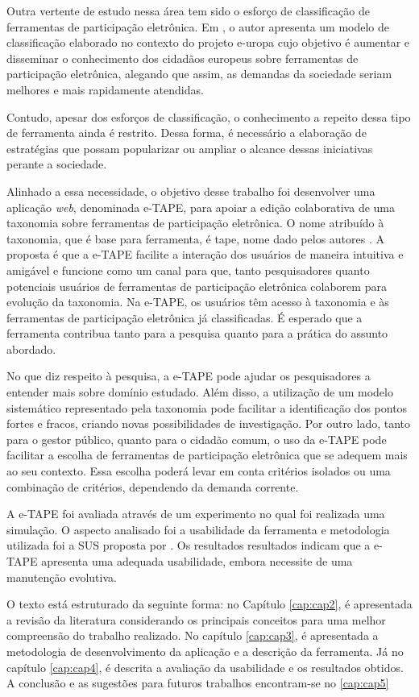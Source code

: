 \par
Outra vertente de estudo nessa área tem sido o esforço de classificação de ferramentas de participação eletrônica. Em  , o autor apresenta um modelo 
de classificação elaborado no contexto do projeto \acrfull{e-uropa} cujo objetivo é aumentar e disseminar o conhecimento dos cidadãos europeus sobre ferramentas de participação 
eletrônica, alegando que assim, as demandas da sociedade seriam melhores e mais rapidamente atendidas. 
\par
Contudo, apesar dos esforços de classificação, o conhecimento a repeito dessa 
tipo de ferramenta ainda é restrito. Dessa forma, é necessário a elaboração de estratégias que possam popularizar ou ampliar o alcance dessas iniciativas perante a sociedade.

\par
Alinhado a essa necessidade, o objetivo desse trabalho foi desenvolver uma aplicação \textit{web}, denominada e-TAPE, para apoiar a edição colaborativa de uma taxonomia sobre 
ferramentas de participação eletrônica. O nome atribuído à taxonomia, que é base para ferramenta, é \acrfull{tape}, nome dado pelos autores . 
A proposta é que a e-TAPE facilite a interação dos usuários de maneira intuitiva e amigável e funcione como um canal para que, tanto pesquisadores quanto potenciais usuários de
ferramentas de participação eletrônica colaborem para evolução da taxonomia. Na e-TAPE, os usuários têm acesso à taxonomia e às ferramentas de participação eletrônica já classificadas.
É esperado que a ferramenta contribua tanto para a pesquisa quanto para a prática do assunto abordado. 

\par
No que diz respeito à pesquisa, a e-TAPE pode ajudar os pesquisadores a entender mais sobre domínio estudado. Além disso, a utilização de um modelo sistemático representado pela taxonomia 
pode facilitar a identificação dos pontos fortes e fracos, criando novas possibilidades de investigação. Por outro lado, tanto para o gestor público, quanto para o cidadão comum, 
o uso da e-TAPE pode facilitar a escolha de ferramentas de participação eletrônica que se adequem mais ao seu contexto. Essa escolha poderá levar em conta critérios 
isolados ou uma combinação de critérios, dependendo da demanda corrente. 

\par
A e-TAPE foi avaliada através de um experimento no qual foi realizada uma simulação. O aspecto analisado foi a usabilidade da ferramenta e metodologia utilizada foi a SUS proposta por . Os resultados resultados indicam que a e-TAPE apresenta uma adequada usabilidade, embora necessite de uma manutenção evolutiva.

\par
O texto está estruturado da seguinte forma: no Capítulo \ref{cap:cap2}, é apresentada a revisão da literatura considerando os principais conceitos para uma melhor 
compreensão do trabalho realizado. No capítulo \ref{cap:cap3}, é apresentada a metodologia de desenvolvimento da aplicação e a descrição da ferramenta. Já no capítulo \ref{cap:cap4}, é descrita a avaliação da usabilidade e os resultados obtidos. 
A conclusão e as sugestões para futuros trabalhos encontram-se no \ref{cap:cap5}
